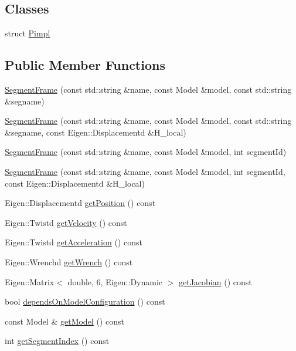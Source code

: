 \subsection*{Classes}
\begin{DoxyCompactItemize}
\item 
struct \hyperlink{structocra_1_1SegmentFrame_1_1Pimpl}{Pimpl}
\end{DoxyCompactItemize}
\subsection*{Public Member Functions}
\begin{DoxyCompactItemize}
\item 
\hyperlink{classocra_1_1SegmentFrame_ab05987e2ecc0f904c905b9e66269ce84}{Segment\+Frame} (const std\+::string \&name, const Model \&model, const std\+::string \&segname)
\item 
\hyperlink{classocra_1_1SegmentFrame_ad9cd47c330239c77e913d38029af808d}{Segment\+Frame} (const std\+::string \&name, const Model \&model, const std\+::string \&segname, const Eigen\+::\+Displacementd \&H\+\_\+local)
\item 
\hyperlink{classocra_1_1SegmentFrame_a01156da94eca5bf4961077a3310fc271}{Segment\+Frame} (const std\+::string \&name, const Model \&model, int segment\+Id)
\item 
\hyperlink{classocra_1_1SegmentFrame_a3864bc8263c40f7afa11de3c8c2dd76b}{Segment\+Frame} (const std\+::string \&name, const Model \&model, int segment\+Id, const Eigen\+::\+Displacementd \&H\+\_\+local)
\item 
Eigen\+::\+Displacementd \hyperlink{classocra_1_1SegmentFrame_ad0c5aa3b15b384cd5a4774ddd534b32e}{get\+Position} () const
\item 
Eigen\+::\+Twistd \hyperlink{classocra_1_1SegmentFrame_a6a45d4901408704ead9bbd1f5b99a666}{get\+Velocity} () const
\item 
Eigen\+::\+Twistd \hyperlink{classocra_1_1SegmentFrame_aa8f7f9544b59da591d94ac8e6a8a9e5d}{get\+Acceleration} () const
\item 
Eigen\+::\+Wrenchd \hyperlink{classocra_1_1SegmentFrame_a47bebcb9817083395ab034fe8fb72a19}{get\+Wrench} () const
\item 
Eigen\+::\+Matrix$<$ double, 6, Eigen\+::\+Dynamic $>$ \hyperlink{classocra_1_1SegmentFrame_a1ece38dd51a3331dfe3de7911ad9291e}{get\+Jacobian} () const
\item 
bool \hyperlink{classocra_1_1SegmentFrame_a68708b5ced24d192fbb0bfd9e3647925}{depends\+On\+Model\+Configuration} () const
\item 
const Model \& \hyperlink{classocra_1_1SegmentFrame_a3a14b77753ad98507db9968b33c582e4}{get\+Model} () const
\item 
int \hyperlink{classocra_1_1SegmentFrame_a8f651dccb13afc25504531efd17c8eef}{get\+Segment\+Index} () const
\end{DoxyCompactItemize}
